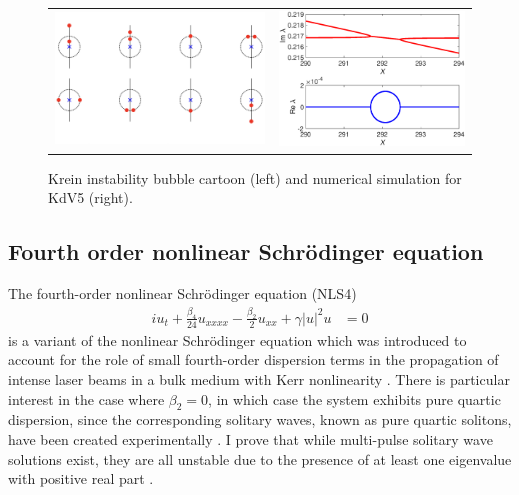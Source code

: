 \documentclass[12pt,reqno,oneside,hidelinks]{article}
\begin{document}
\begin{figure}
\begin{center}
\begin{tabular}{cc}
\includegraphics[width=9cm]{images/KreinBubbleCartoonSS2.png} & 
\includegraphics[width=8cm]{images/kreinbubble1.eps}
\end{tabular}
\end{center}
\caption{Krein instability bubble cartoon (left) and numerical simulation for KdV5 (right).}
\label{fig:kreinbubble1}
\end{figure}

\subsection*{Fourth order nonlinear Schr\"odinger equation}

The fourth-order nonlinear Schr{\"o}dinger equation (NLS4) 
\begin{align*}
    i u_t + \frac{\beta_4}{24}u_{xxxx} - \frac{\beta_2}{2}u_{xx} + \gamma |u|^2 u &= 0 
\end{align*}
is a variant of the nonlinear Schr{\"o}dinger equation which was introduced to account for the role of small fourth-order dispersion terms in the propagation of intense laser beams in a bulk medium with Kerr nonlinearity \cite{Karpman2000,Tam2020}. There is particular interest in the case where $\beta_2 = 0$, in which case the system exhibits pure quartic dispersion, since the corresponding solitary waves, known as pure quartic solitons, have been created experimentally \cite{Tam2019}. I prove that while multi-pulse solitary wave solutions exist, they are all unstable due to the presence of at least one eigenvalue with positive real part \cite[Theorems 1 and 2]{Parker2020NLS4}.
\end{document}

